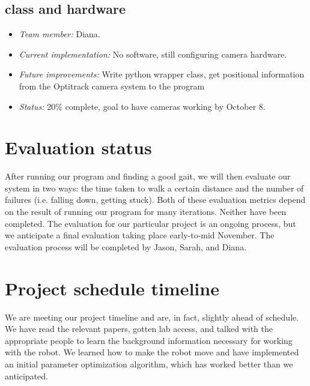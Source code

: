\subsection*{ class and hardware}

\begin{itemize}
\item \emph{Team member:} Diana.
\item \emph{Current implementation:} No software, still configuring
  camera hardware.
\item \emph{Future improvements:} Write python wrapper class, get
  positional information from the Optitrack camera system to the program
\item \emph{Status:} 20\% complete, goal to have cameras working by October 8.
\end{itemize}



\section{Evaluation status}

After running our program and finding a good gait, we will then
evaluate our system in two ways: the time taken to walk a certain
distance and the number of failures (i.e. falling down, getting
stuck). Both of these evaluation metrics depend on the result of
running our program for many iterations. Neither have been
completed. The evaluation for our particular project is an ongoing
process, but we anticipate a final evaluation taking place
early-to-mid November. The evaluation process will be completed by
Jason, Sarah, and Diana.

\section{Project schedule timeline}

We are meeting our project timeline and are, in fact, slightly ahead
of schedule. We have read the relevant papers, gotten lab access, and
talked with the appropriate people to learn the background information
necessary for working with the robot. We learned how to make the robot
move and have implemented an initial parameter optimization algorithm,
which has worked better than we anticipated.



